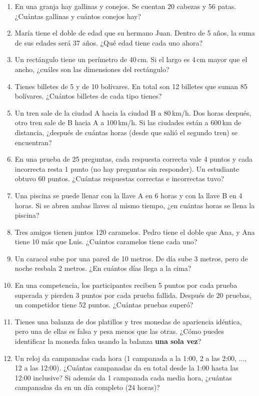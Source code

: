 \documentclass[12pt, letterpaper]{article}
\begin{document}
\begin{enumerate}[leftmargin=*, resume]
  \item \facil{} En una granja hay gallinas y conejos. Se cuentan 20 cabezas y 56 patas. ¿Cuántas gallinas y cuántos conejos hay?

  \item \facil{} María tiene el doble de edad que su hermano Juan. Dentro de 5 años, la suma de sus edades será 37 años. ¿Qué edad tiene cada uno ahora?

  \item \facil{} Un rectángulo tiene un perímetro de 40\,cm. Si el largo es 4\,cm mayor que el ancho, ¿cuáles son las dimensiones del rectángulo?

  \item \facil{} Tienes billetes de 5 y de 10 bolívares. En total son 12 billetes que suman 85 bolívares. ¿Cuántos billetes de cada tipo tienes?

  \item \medio{} Un tren sale de la ciudad A hacia la ciudad B a 80\,km/h. Dos horas después, otro tren sale de B hacia A a 100\,km/h. Si las ciudades están a 600\,km de distancia, ¿después de cuántas horas (desde que salió el segundo tren) se encuentran?

  \item \medio{} En una prueba de 25 preguntas, cada respuesta correcta vale 4 puntos y cada incorrecta resta 1 punto (no hay preguntas sin responder). Un estudiante obtuvo 60 puntos. ¿Cuántas respuestas correctas e incorrectas tuvo?

  \item \medio{} Una piscina se puede llenar con la llave A en 6 horas y con la llave B en 4 horas. Si se abren ambas llaves al mismo tiempo, ¿en cuántas horas se llena la piscina?

  \item \medio{} Tres amigos tienen juntos 120 caramelos. Pedro tiene el doble que Ana, y Ana tiene 10 más que Luis. ¿Cuántos caramelos tiene cada uno?

  \item \dificil{} Un caracol sube por una pared de 10 metros. De día sube 3 metros, pero de noche resbala 2 metros. ¿En cuántos días llega a la cima?

  \item \dificil{} En una competencia, los participantes reciben 5 puntos por cada prueba superada y pierden 3 puntos por cada prueba fallida. Después de 20 pruebas, un competidor tiene 52 puntos. ¿Cuántas pruebas superó?

  \item \dificil{} Tienes una balanza de dos platillos y tres monedas de apariencia idéntica, pero una de ellas es falsa y pesa menos que las otras. ¿Cómo puedes identificar la moneda falsa usando la balanza \textbf{una sola vez}?

  \item \dificil{} Un reloj da campanadas cada hora (1 campanada a la 1:00, 2 a las 2:00, ..., 12 a las 12:00). ¿Cuántas campanadas da en total desde la 1:00 hasta las 12:00 inclusive? Si además da 1 campanada cada media hora, ¿cuántas campanadas da en un día completo (24 horas)?
\end{enumerate}
\end{document}
